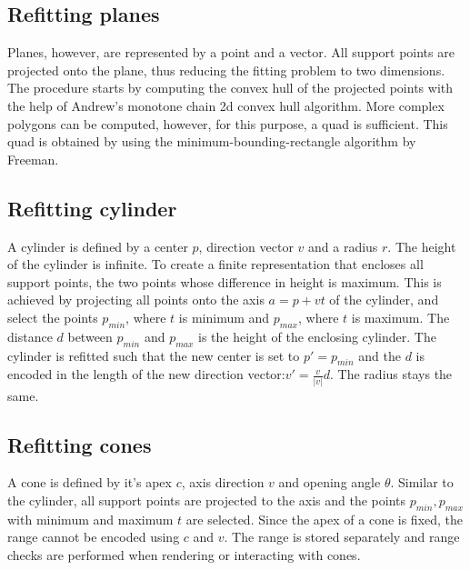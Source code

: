 \subsection{Refitting planes}
Planes, however, are represented by a point and a vector. All support points are projected onto the plane, thus reducing the fitting problem to two dimensions. The procedure starts by computing the convex hull of the projected points with the help of Andrew's monotone chain 2d convex hull algorithm\cite{andrew1979another}. 
More complex polygons can be computed, however, for this purpose, a quad is sufficient. This quad is obtained by using the minimum-bounding-rectangle algorithm by Freeman\cite{freeman1975determining}. 

\subsection{Refitting cylinder}
A cylinder is defined by a center $p$, direction vector $v$ and a radius $r$. The height of the cylinder is infinite. To create a finite representation that encloses all support points, the two points whose difference in height is maximum. This is achieved by projecting all points onto the axis $a = p + vt$ of the cylinder, and select the points $p_{min}$, where $t$ is minimum and $p_{max}$, where $t$ is maximum. The distance $d$ between $p_{min}$ and $p_{max}$ is the height of the enclosing cylinder. The cylinder is refitted such that the new center is set to $p' = p_{min}$ and the $d$ is encoded in the length of the new direction vector:$v' = \frac{v}{|v|}d$. The radius stays the same. 

\subsection{Refitting cones}
A cone is defined by it's apex $c$, axis direction $v$ and opening angle $\theta$. Similar to the cylinder, all support points are projected to the axis and the points $p_{min}, p_{max}$ with minimum and maximum $t$ are selected. Since the apex of a cone is fixed, the range cannot be encoded using $c$ and $v$. The range is stored separately and range checks are performed when rendering or interacting with cones. 
